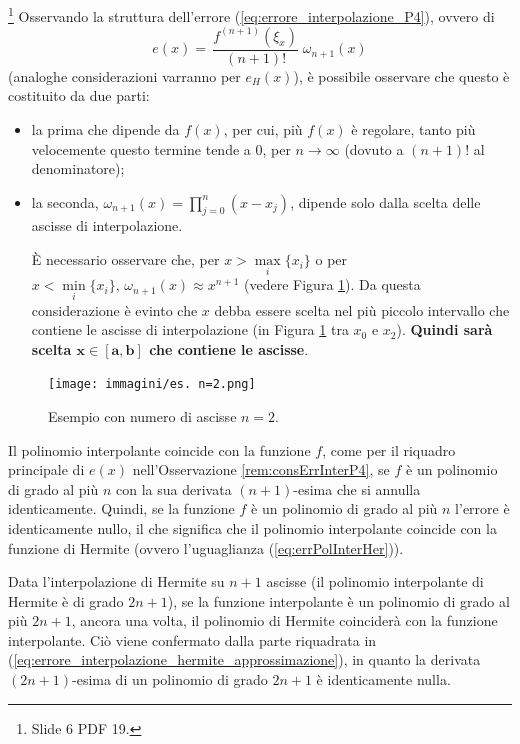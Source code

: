 \begin{remark}\label{rem:consErrInterP4}\footnote{Slide 6 PDF 19.}
    Osservando la struttura dell'errore (\ref{eq:errore_interpolazione_P4}), ovvero di
    \begin{equation*}
        e(x)=\,\boxed{\boxed{\frac{f^{(n+1)}(\xi_x)}{(n+1)!}}\;\boxed{\omega_{n+1}(x)}}
    \end{equation*}
    (analoghe considerazioni varranno per $e_H(x)$), è possibile osservare che questo è costituito da due parti:
    \begin{itemize}
    	\item la prima che dipende da $\boxed{f(x)}$, per cui, più $f(x)$ è regolare, tanto più velocemente questo termine tende a 0, per $n\rightarrow\infty$ (dovuto a $(n+1)!$ al denominatore);
    	\item la seconda, $\boxed{\omega_{n+1}(x)=\prod_{j=0}^n(x-x_j)}$, dipende solo dalla scelta delle ascisse di interpolazione.
    	
    	È necessario osservare che, per $x>\underset{i}{\max}\{x_i\}$ o per $x<\underset{i}{\min}\{x_i\},\, \omega_{n+1}(x)\approx x^{n+1}$ (vedere Figura \ref{fig:osservazione_errore_interpolazione}). Da questa considerazione è evinto che $x$ debba essere scelta nel più piccolo intervallo che contiene le ascisse di interpolazione (in Figura \ref{fig:osservazione_errore_interpolazione} tra $x_0$ e $x_2$). \textbf{Quindi sarà scelta $\boldsymbol{x\in [a,b]}$ che contiene le ascisse}.
    \end{itemize}
\end{remark}

\begin{figure}
    \centering
    \texttt{[image: immagini/es. n=2.png]}
    \caption{\label{fig:osservazione_errore_interpolazione} Esempio con numero di ascisse $n=2$.}
\end{figure}

Il polinomio interpolante coincide con la funzione $f$, come per il riquadro principale di $e(x)$ nell'Osservazione \ref{rem:consErrInterP4}, se $f$ è un polinomio di grado al più $n$ con la sua derivata $(n+1)$-esima che si annulla identicamente. Quindi, se la funzione $f$ è un polinomio di grado al più $n$ l'errore è identicamente nullo, il che significa che il polinomio interpolante coincide con la funzione di Hermite (ovvero l'uguaglianza (\ref{eq:errPolInterHer})).

Data l'interpolazione di Hermite su $n+1$ ascisse (il polinomio interpolante di Hermite è di grado $2n+1$), se la funzione interpolante è un polinomio di grado al più $2n+1$, ancora una volta, il polinomio di Hermite coinciderà con la funzione interpolante. Ciò viene confermato dalla parte riquadrata in (\ref{eq:errore_interpolazione_hermite_approssimazione}), in quanto la derivata $(2n+1)$-esima di un polinomio di grado $2n+1$ è identicamente nulla.

